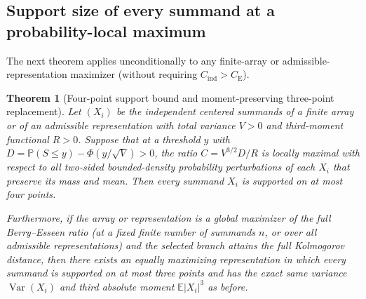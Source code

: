 \documentclass[11pt]{article}
\numberwithin{equation}{section}
\newtheorem{theorem}{Theorem}[section]
\theoremstyle{definition}
\DeclareMathOperator{\Var}{Var}
\newcommand{\E}{\mathbb E}
\newcommand{\Pp}{\mathbb P}
\newcommand{\ce}{C_{\mathrm E}}
\newcommand{\ci}{C_{\mathrm{ind}}}
\begin{document}
\subsection{Support size of every summand at a probability-local maximum}

The next theorem applies unconditionally to any finite-array or
admissible-representation maximizer (without requiring $\ci>\ce$).

\begin{theorem}[Four-point support bound and moment-preserving three-point replacement]
\label{thm:original-support}
Let $(X_i)$ be the independent centered summands of a finite array or of an
admissible representation with total variance $V>0$ and third-moment
functional $R>0$. Suppose that at a threshold $y$ with
$D=\Pp(S\le y)-\Phi(y/\sqrt V)>0$, the ratio $C=V^{3/2}D/R$ is locally
maximal with respect to all two-sided bounded-density probability
perturbations of each $X_i$ that preserve its mass and mean. Then every
summand $X_i$ is supported on at most four points.

Furthermore, if the array or representation is a global maximizer of the
full Berry--Esseen ratio (at a fixed finite number of summands $n$, or over
all admissible representations) and the selected branch attains the full
Kolmogorov distance, then there exists an equally maximizing representation
in which every summand is supported on at most three points and has the exact
same variance $\Var(X_i)$ and third absolute moment $\E|X_i|^3$ as before.
\end{theorem}
\end{document}
